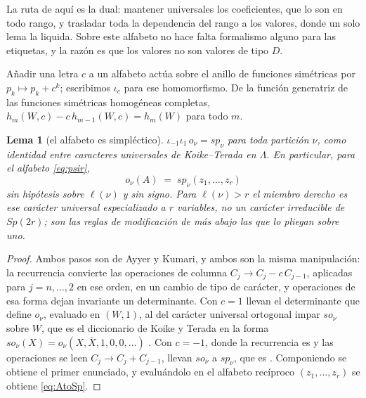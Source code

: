 \documentclass[11pt,reqno]{amsart}
\theoremstyle{plain}
\newtheorem{lemma}[theorem]{Lema}
\theoremstyle{definition}
\begin{document}
La ruta de aquí es la dual: mantener universales los coeficientes, que lo son en
todo rango, y trasladar toda la dependencia del rango a los valores, donde un solo lema la liquida.
Sobre este alfabeto no hace falta formalismo alguno para las etiquetas, y la razón es que los valores
no son valores de tipo $D$.

Añadir una letra $c$ a un alfabeto actúa sobre el anillo de funciones simétricas por
$p_k\mapsto p_k+c^k$; escribimos $\iota_c$ para ese homomorfismo. De la función generatriz de las
funciones simétricas homogéneas completas, $h_m(W,c)-c\,h_{m-1}(W,c)=h_m(W)$ para todo $m$.

\begin{lemma}[el alfabeto es simpléctico]\label{lem:AtoSp}
$\iota_{-1}\iota_{1}\,o_\nu=sp_\nu$ para toda partición $\nu$, como identidad entre caracteres
\emph{universales} de Koike--Terada en $\Lambda$. En particular, para el alfabeto
\eqref{eq:psir},
\begin{equation}\label{eq:AtoSp}
o_\nu(A)\;=\;sp_\nu(z_1,\dots,z_r)
\end{equation}
sin hipótesis sobre $\ell(\nu)$ y sin signo. Para $\ell(\nu)>r$ el miembro derecho es ese
carácter universal especializado a $r$ variables, no un carácter irreducible de $Sp(2r)$; son las
reglas de modificación de más abajo las que lo pliegan sobre uno.
\end{lemma}

\begin{proof}
Ambos pasos son de Ayyer y Kumari, y ambos son la misma manipulación: la recurrencia convierte las
operaciones de columna $C_j\to C_j-c\,C_{j-1}$, aplicadas para $j=n,\dots,2$ en ese orden, en un
cambio de tipo de carácter, y operaciones de esa forma dejan invariante un determinante. Con $c=1$
llevan el determinante que define $o_\nu$, evaluado en $(W,1)$, al del carácter universal ortogonal
impar $so_\nu$ sobre $W$, que es el diccionario de Koike y Terada en la forma
$so_\nu(X)=o_\nu(X,\bar X,1,0,0,\dots)$ \cite[(2.13)]{AK25}. Con $c=-1$, donde la recurrencia es
\cite[Proposición 2.1]{AK25} y las operaciones se leen $C_j\to C_j+C_{j-1}$, llevan $so_\nu$ a
$sp_\nu$, que es \cite[Lema 3.2]{AK25}. Componiendo se obtiene el primer enunciado, y evaluándolo en
el alfabeto recíproco $(z_1,\dots,z_r)$ se obtiene \eqref{eq:AtoSp}.
\end{proof}
\end{document}

